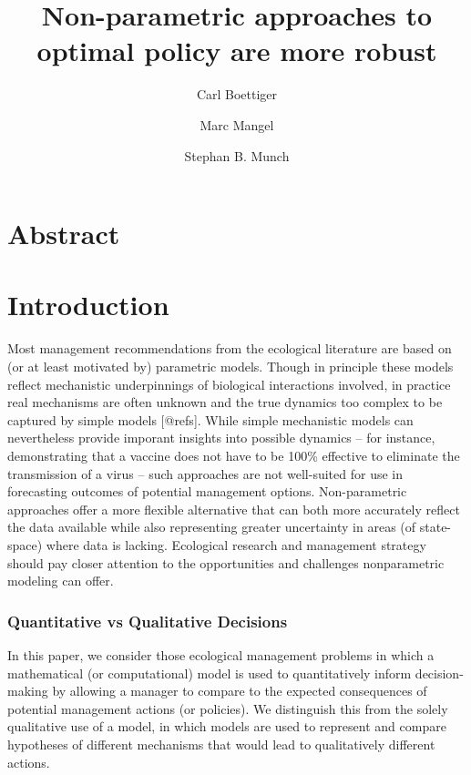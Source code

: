 \documentclass[author-year, review]{elsarticle} %
\begin{document}
\begin{frontmatter}
  \title{Non-parametric approaches to optimal policy are more robust}
  \author[cstar]{Carl Boettiger}
  \author[cstar]{Marc Mangel}
  \author[noaa]{Stephan B. Munch}
  \address[cstar]{Center for Stock Assessment Research, Department of Applied Math and Statistics, University of California, Mail Stop SOE-2, Santa Cruz, CA 95064, USA}
  \address[noaa]{Southwest Fisheries Science Center, National Oceanic and Atmospheric Administration, 110 Shaffer Road, Santa Cruz, CA 95060, USA}
 \end{frontmatter}


\section{Abstract}

\section{Introduction}

Most management recommendations from the ecological literature are based
on (or at least motivated by) parametric models. Though in principle
these models reflect mechanistic underpinnings of biological
interactions involved, in practice real mechanisms are often unknown and
the true dynamics too complex to be captured by simple models
{[}@refs{]}. While simple mechanistic models can nevertheless provide
imporant insights into possible dynamics -- for instance, demonstrating
that a vaccine does not have to be 100\% effective to eliminate the
transmission of a virus -- such approaches are not well-suited for use
in forecasting outcomes of potential management options. Non-parametric
approaches offer a more flexible alternative that can both more
accurately reflect the data available while also representing greater
uncertainty in areas (of state-space) where data is lacking. Ecological
research and management strategy should pay closer attention to the
opportunities and challenges nonparametric modeling can offer.

\subsubsection{Quantitative vs Qualitative Decisions}

In this paper, we consider those ecological management problems in which
a mathematical (or computational) model is used to quantitatively inform
decision-making by allowing a manager to compare to the expected
consequences of potential management actions (or policies). We
distinguish this from the solely qualitative use of a model, in which
models are used to represent and compare hypotheses of different
mechanisms that would lead to qualitatively different actions.
\end{document}
